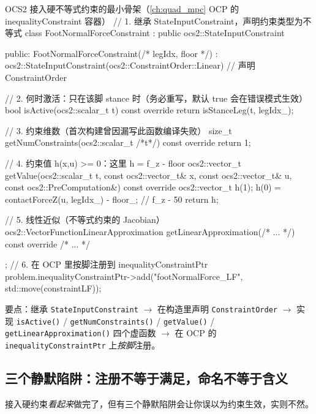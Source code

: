\begin{codebox}[C++]{OCS2 接入硬不等式约束的最小骨架（\cref{ch:quad_mpc} OCP 的 inequalityConstraint 容器）}
// 1. 继承 StateInputConstraint，声明约束类型为不等式
class FootNormalForceConstraint : public ocs2::StateInputConstraint {
public:
  FootNormalForceConstraint(/* legIdx, floor */)
    : ocs2::StateInputConstraint(ocs2::ConstraintOrder::Linear) {}  // 声明 ConstraintOrder

  // 2. 何时激活：只在该脚 stance 时（务必重写，默认 true 会在错误模式生效）
  bool isActive(ocs2::scalar_t t) const override { return isStanceLeg(t, legIdx_); }

  // 3. 约束维数（首次构建曾因漏写此函数编译失败）
  size_t getNumConstraints(ocs2::scalar_t /*t*/) const override { return 1; }

  // 4. 约束值 h(x,u) >= 0：这里 h = f_z - floor
  ocs2::vector_t getValue(ocs2::scalar_t t, const ocs2::vector_t& x,
                          const ocs2::vector_t& u, const ocs2::PreComputation&) const override {
    ocs2::vector_t h(1);
    h(0) = contactForceZ(u, legIdx_) - floor_;   // f_z - 50
    return h;
  }

  // 5. 线性近似（不等式约束的 Jacobian）
  ocs2::VectorFunctionLinearApproximation getLinearApproximation(/* ... */) const override { /* ... */ }
};
// 6. 在 OCP 里按脚注册到 inequalityConstraintPtr
problem.inequalityConstraintPtr->add("footNormalForce_LF", std::move(constraintLF));
\end{codebox}

要点：继承 \texttt{StateInputConstraint} $\to$ 在构造里声明 \texttt{ConstraintOrder} $\to$ 实现 \texttt{isActive()} / \texttt{getNumConstraints()} / \texttt{getValue()} / \texttt{getLinearApproximation()} 四个虚函数 $\to$ 在 OCP 的 \texttt{inequalityConstraintPtr} 上\emph{按脚}注册。

\subsection{三个静默陷阱：注册不等于满足，命名不等于含义}
\label{subsec:lb-traps}

接入硬约束\emph{看起来}做完了，但有三个静默陷阱会让你误以为约束生效，实则不然。

